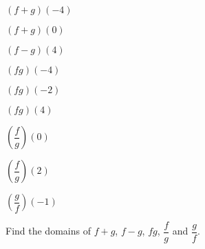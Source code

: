 \documentclass{ximera}
\begin{document}
\begin{question}

\begin{problem}\label{arithfromgraphfirst}
$(f + g)(-4)$
\end{problem}

\begin{problem}
$(f + g)(0)$
\end{problem}
 
\begin{problem}
$(f- g)(4)$
\end{problem} 

\begin{problem}
$(fg)(-4)$
\end{problem}  

\begin{problem}
$(fg)(-2)$
\end{problem} 

\begin{problem}
$(fg)(4)$
\end{problem} 

\begin{problem}
$\left(\dfrac{f}{g}\right)(0)$
\end{problem} 

\begin{problem}
$\left(\dfrac{f}{g}\right)(2)$
\end{problem}

\begin{problem}
$\left(\dfrac{g}{f}\right)(-1)$ 
\end{problem}

\begin{problem}\label{arithfromgraphlast}
Find the domains of $f+g$, $f-g$,  $fg$, $\dfrac{f}{g}$ and $\dfrac{g}{f}$.
\end{problem}

\end{question}
\end{document}
